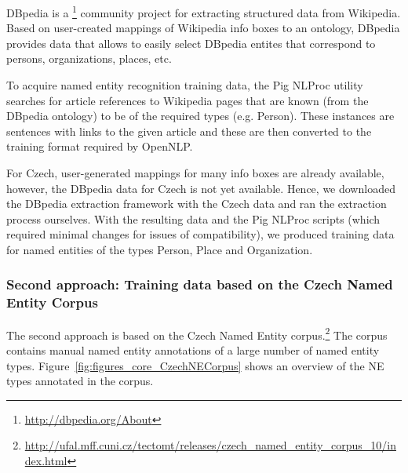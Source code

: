 DBpedia is a \footnote{\url{http://dbpedia.org/About}} community project for extracting 
structured data from Wikipedia. Based on user-created mappings of Wikipedia info boxes to
an ontology, DBpedia provides data that allows to easily select DBpedia entites that 
correspond to persons, organizations, places, etc.

To acquire named entity recognition training data, the Pig NLProc utility searches
for article references to Wikipedia pages that are known (from the DBpedia ontology)
to be of the required types (e.g. Person). These instances are sentences with links
to the given article and these are then converted to the training format required 
by OpenNLP.

For Czech, user-generated mappings for many info boxes are already available, however,
the DBpedia data for Czech is not yet available. Hence, we downloaded the DBpedia
extraction framework with the Czech data and ran the extraction process ourselves.
With the resulting data and the Pig NLProc scripts (which required minimal changes
for issues of compatibility), we produced training data for named entities of the types
Person, Place and Organization.



\subsubsection*{Second approach: Training data based on the Czech Named Entity Corpus}

The second approach is based on the Czech Named Entity corpus.\footnote{\url{http://ufal.mff.cuni.cz/tectomt/releases/czech_named_entity_corpus_10/index.html}}
The corpus contains manual named entity annotations of a large number of named entity types. Figure~\ref{fig:figures_core_CzechNECorpus}
shows an overview of the NE types annotated in the corpus.


